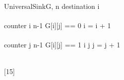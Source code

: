 \documentclass[addpoints]{exam}
\begin{document}
\begin{questions}
\begin{solution}
\begin{pseudocode}{UniversalSink}{G, n}
	  	destination \GETS i \\ \\
	  	
	  	\FOR counter \GETS i \TO n-1 \DO
	  	\BEGIN
	  		\IF G[i][j] == 0 
	  		\THEN i = i + 1
	  		\ELSE 
	  	\END \\ \\
	  	
	  	\FOR counter \GETS j \TO n-1 \DO
	  	\BEGIN
	  	\IF G[i][j] == 1 \AND i \neq j
	  	\THEN j = j + 1
	  	\ELSE 
	  	\END \\ \\
	  	
  		\ENDPROCEDURE
  	\end{pseudocode}
  \end{solution}
\pagebreak


  [15]


\end{questions}
\end{document}
